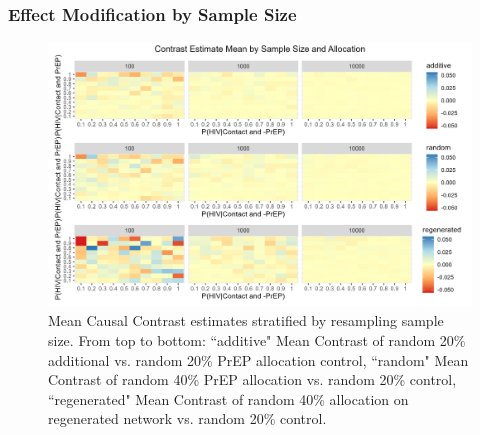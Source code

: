\documentclass{article}
\theoremstyle{definition}
\begin{document}
\subsubsection{Effect Modification by Sample Size}
\begin{figure}[H]
    \centering
    \includegraphics[scale=0.8]{Figures/Sample size Mean plots.png}
    \caption{Mean Causal Contrast estimates stratified by resampling sample size. From top to bottom: ``additive" Mean Contrast of random 20\% additional vs. random 20\% PrEP allocation control, ``random" Mean Contrast of random 40\% PrEP allocation vs. random 20\% control, ``regenerated" Mean Contrast of random 40\% allocation on regenerated network vs. random 20\% control.}
    \label{fig:Figure 9}
\end{figure}
\end{document}
